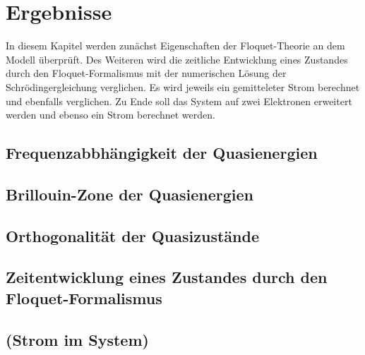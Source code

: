 \chapter{Ergebnisse}
In diesem Kapitel werden zunächst
Eigenschaften der Floquet-Theorie an dem Modell überprüft.
Des Weiteren wird die zeitliche Entwicklung
eines Zustandes durch den
Floquet-Formalismus mit der numerischen Lösung der
Schrödingergleichung verglichen. Es wird jeweils ein gemitteleter Strom berechnet und
ebenfalls verglichen.
Zu Ende soll das System auf zwei Elektronen erweitert werden und ebenso ein Strom berechnet werden.
\section{Frequenzabbhängigkeit der Quasienergien}



\section{Brillouin-Zone der Quasienergien}

\section{Orthogonalität der Quasizustände}

\section{Zeitentwicklung eines Zustandes durch den Floquet-Formalismus}

\section{(Strom im System)}
